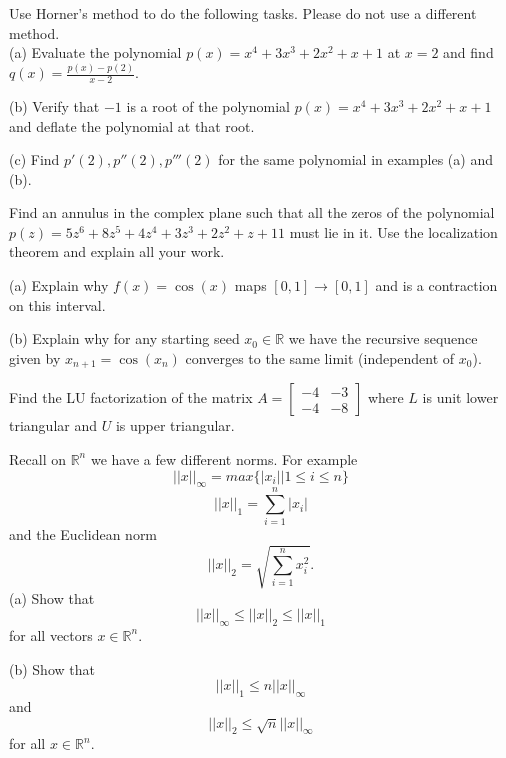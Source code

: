 \documentclass[12pt]{article}
\begin{document}
\newpage
{}
Use Horner's method to do the following tasks. Please do not use a different method. \\
(a) Evaluate the polynomial $p(x)=x^4+3x^3+2x^2+x+1$ at $x=2$ and find $q(x)=\frac{p(x)-p(2)}{x-2}$. 

\vspace{ 2 in}

\noindent
(b) Verify that $-1$ is a root of the polynomial $p(x)=x^4+3x^3+2x^2+x+1$ and deflate the polynomial at that root. \\

\vspace{2 in}

\noindent
(c) Find $p'(2),p''(2), p'''(2)$ for the same polynomial in examples (a) and (b).

\newpage
{} Find an annulus in the complex plane such that all the zeros of the polynomial 
$p(z)=5z^6 + 8z^5 + 4z^4 + 3z^3+2z^2+z+11$ must lie in it. Use the localization theorem and explain all your work.


\newpage
{} 
(a) Explain why $f(x)=\cos(x)$ maps $[0,1] \to [0,1]$ and is a contraction on this interval. 

\vspace{3 in}

\noindent
(b) Explain why for any starting seed $x_0 \in \mathbb{R}$ we have the recursive sequence given by $x_{n+1}=\cos(x_n)$ converges to the 
same limit (independent of $x_0$).

\anotherpart

\noindent
Find the LU factorization of the matrix $A=\begin{bmatrix}   -4 & - 3 \\ -4 & - 8 \end{bmatrix}$ where $L$ is unit lower triangular and $U$ is upper triangular.

\vspace{3in}

Recall on $\mathbb{R}^n$ we have a few different norms. For example
$$
||x||_{\infty}=max\{ |x_i| | 1 \leq i \leq n \}
$$
$$
||x||_{1}=\sum_{i=1}^n |x_i| 
$$
and the Euclidean norm 
$$
||x||_{2}=\sqrt{\sum_{i=1}^n x_i^2}.
$$
(a) Show that $$||x||_{\infty} \leq ||x||_2 \leq ||x||_1$$ for all vectors $x \in \mathbb{R}^n$. \\

\vspace{2in}

\noindent
(b) Show that $$||x||_1 \leq n ||x||_{\infty}$$ and $$||x||_2 \leq \sqrt{n} ||x||_{\infty}$$ for all $x \in \mathbb{R}^n$. \\
\end{document}
